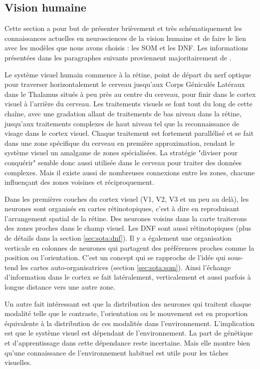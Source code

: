 \subsection{Vision humaine}\label{sec:sota:human_vis}

	Cette section a pour but de présenter brièvement et très schématiquement les connaissances actuelles en neurosciences de la vision humaine et de faire le lien avec les modèles que nous avons choisis : les SOM et les DNF. Les informations présentées dans les paragraphes suivants proviennent majoritairement de \cite{gilbert2020constructive}.

	Le système visuel humain commence à la rétine, point de départ du nerf optique pour traverser horizontalement le cerveau jusqu'aux Corps Géniculés Latéraux dans le Thalamus situés à peu près au centre du cerveau, pour finir dans le cortex visuel à l'arrière du cerveau. Les traitements visuels se font tout du long de cette chaîne, avec une gradation allant de traitements de bas niveau dans la rétine, jusqu'aux traitements complexes de haut niveau tel que la reconnaissance de visage dans le cortex visuel. Chaque traitement est fortement parallélisé et se fait dans une zone spécifique du cerveau en première approximation, rendant le système visuel un amalgame de zones spécialisées. La stratégie "diviser pour conquérir" semble donc aussi utilisée dans le cerveau pour traiter des données complexes. Mais il existe aussi de nombreuses connexions entre les zones, chacune influençant des zones voisines et réciproquement.

	Dans les premières couches du cortex visuel (V1, V2, V3 et un peu au delà), les neurones sont organisés en cartes rétinotopiques, c'est à dire en reproduisant l'arrangement spatial de la rétine. Des neurones voisins dans la carte traiterons des zones proches dans le champ visuel. Les DNF sont aussi rétinotopiques (plus de détails dans la section \ref{sec:sota:dnf}). Il y a également une organisation verticale en colonnes de neurones qui partagent des préférences proches comme la position ou l'orientation. C'est un concept qui se rapproche de l'idée qui sous-tend les cartes auto-organisatrices (section \ref{sec:sota:som}). Ainsi l'échange d'information dans le cortex se fait latéralement, verticalement et aussi parfois à longue distance vers une autre zone.

	Un autre fait intéressant est que la distribution des neurones qui traitent chaque modalité telle que le contraste, l'orientation ou le mouvement est en proportion équivalente à la distribution de ces modalités dans l'environnement. L'implication est que le système visuel est dépendant de l'environnement. La part de génétique et d'apprentissage dans cette dépendance reste incertaine. Mais elle montre bien qu'une connaissance de l'environnement habituel est utile pour les tâches visuelles.

